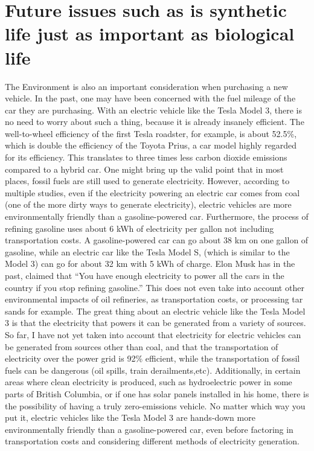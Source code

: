 \documentclass{IEEEtran}
\begin{document}
\section{Future issues such as is synthetic life just as important as biological life}
The Environment is also an important consideration when purchasing a new vehicle.
In the past, one may have been concerned with the fuel mileage of the car they are purchasing.
With an electric vehicle like the Tesla Model 3, there is no need to worry about such a thing,
because it is already insanely efficient. The well-to-wheel efficiency of the first Tesla roadster,
for example, is about 52.5\%, which is double the efficiency of the Toyota Prius\cite{eberhard200621},
a car model highly regarded for its efficiency. This translates to three times less carbon dioxide
emissions compared to a hybrid car.\cite{eberhard200621} One might bring up the valid point that
in most places, fossil fuels are still used to generate electricity. However, according to multiple
studies, even if the electricity powering an electric car comes from coal
(one of the more dirty ways to generate electricity),
electric vehicles are more environmentally friendly than a gasoline-powered car.\cite{cleanerevenwithcoal}
Furthermore, the process of refining gasoline uses about 6 kWh of electricity per gallon not including transportation costs.
A gasoline-powered car can go about 38 km on one gallon of gasoline, while an electric car like the Tesla Model S,
(which is similar to the Model 3) can go for about 32 km with 5 kWh of charge. Elon Musk has
in the past, claimed that ``You have enough electricity to power all the cars
in the country if you stop refining gasoline.''\cite{rosoff_elon_nodate}
This does not even take into account other environmental impacts of oil refineries,
as transportation costs, or processing tar sands for example.\cite{6kwh}
The great thing about an electric vehicle like the Tesla Model 3 is that
the electricity that powers it can be generated from a variety of sources.\cite{eberhard200621}
So far, I have not yet taken into account that electricity for electric vehicles can be generated
from sources other than coal, and that the transportation of electricity over the power grid is
92\% efficient\cite{eberhard200621}, while the transportation of fossil fuels
can be dangerous (oil spills, train derailments,etc). Additionally, in certain areas where clean electricity is produced, such
as hydroelectric power in some parts of British Columbia, or if one has solar
panels installed in his home, there is the possibility of having a truly zero-emissions vehicle.
No matter which way you put it, electric vehicles like the Tesla Model 3 are hands-down
more environmentally friendly than a gasoline-powered car, even before factoring in transportation
costs and considering different methods of electricity generation.
\end{document}

